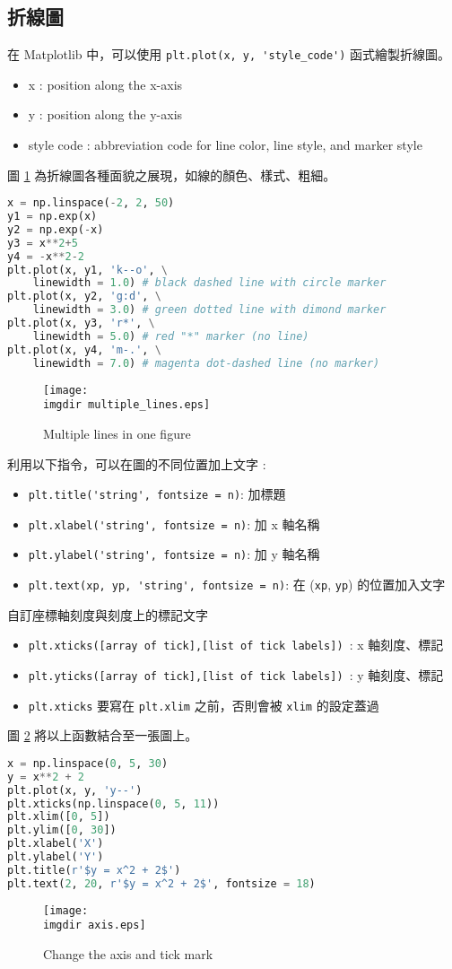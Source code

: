 \subsection{折線圖}
在 Matplotlib 中，可以使用 \verb|plt.plot(x, y, 'style_code')| 函式繪製折線圖。
\begin{itemize}
\item
x : position along the x-axis
\item
y : position along the y-axis
\item
style code : abbreviation code for line color, line style, and marker style
\end{itemize}
圖 \ref{fig:multiple_lines} 為折線圖各種面貌之展現，如線的顏色、樣式、粗細。
\bigskip
\begin{lstlisting}[language = Python]
x = np.linspace(-2, 2, 50)
y1 = np.exp(x)
y2 = np.exp(-x)
y3 = x**2+5
y4 = -x**2-2
plt.plot(x, y1, 'k--o', \
	linewidth = 1.0) # black dashed line with circle marker
plt.plot(x, y2, 'g:d', \
	linewidth = 3.0) # green dotted line with dimond marker
plt.plot(x, y3, 'r*', \
	linewidth = 5.0) # red "*" marker (no line)
plt.plot(x, y4, 'm-.', \
	linewidth = 7.0) # magenta dot-dashed line (no marker)
\end{lstlisting}
\begin{figure}[H]
    \centering
        \texttt{[image: \\imgdir multiple\_lines.eps]}
    \caption{Multiple lines in one figure}
    \label{fig:multiple_lines}
\end{figure}

利用以下指令，可以在圖的不同位置加上文字 : 
\begin{itemize}
\item
\verb|plt.title('string', fontsize = n)|: 加標題
\item
\verb|plt.xlabel('string', fontsize = n)|: 加 x 軸名稱
\item
\verb|plt.ylabel('string', fontsize = n)|: 加 y 軸名稱
\item
\verb|plt.text(xp, yp, 'string', fontsize = n)|: 在 (\verb|xp|, \verb|yp|) 的位置加入文字
\end{itemize}
自訂座標軸刻度與刻度上的標記文字
\begin{itemize}
\item
\verb|plt.xticks([array of tick],[list of tick labels]) |: x 軸刻度、標記
\item
\verb|plt.yticks([array of tick],[list of tick labels]) |: y 軸刻度、標記
\item
\verb|plt.xticks| 要寫在 \verb|plt.xlim| 之前，否則會被 \verb|xlim| 的設定蓋過
\end{itemize}
圖 \ref{fig:axis} 將以上函數結合至一張圖上。
\bigskip
\begin{lstlisting}[language = Python]
x = np.linspace(0, 5, 30)
y = x**2 + 2
plt.plot(x, y, 'y--')
plt.xticks(np.linspace(0, 5, 11)) 
plt.xlim([0, 5])
plt.ylim([0, 30])
plt.xlabel('X')
plt.ylabel('Y')
plt.title(r'$y = x^2 + 2$')
plt.text(2, 20, r'$y = x^2 + 2$', fontsize = 18)
\end{lstlisting}
\begin{figure}[H]
    \centering
        \texttt{[image: \\imgdir axis.eps]}
    \caption{Change the axis and tick mark}
    \label{fig:axis}
\end{figure}


